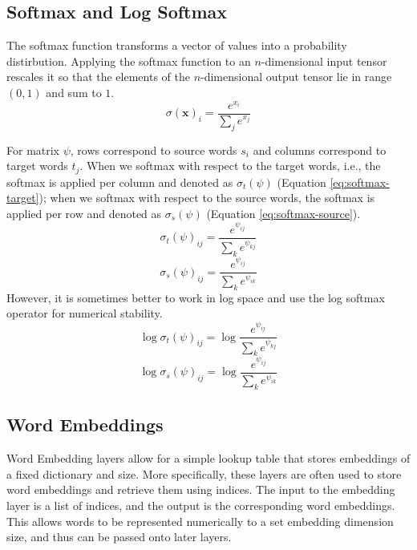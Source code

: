 \documentclass[twoside,twocolumn]{article}
\renewcommand{\vec}[1]{\mathbf{#1}}
\begin{document}
\subsection{Softmax and Log Softmax}
The softmax function transforms a vector of values into a probability
distirbution. Applying the softmax function to an $n$-dimensional input tensor
rescales it so that the elements of the $n$-dimensional output tensor lie in
range $(0,1)$ and sum to $1$.
\begin{equation}
  \sigma(\vec{x})_i = \frac{e^{x_i}}{\sum_j e^{x_j}}
\end{equation}

For matrix $\psi$, rows correspond to source words $s_i$ and columns correspond
to target words $t_j$. When we softmax with respect to the target words, i.e.,
the softmax is applied per column and denoted as $\sigma_t(\psi)$
(Equation \ref{eq:softmax-target}); when we softmax with respect to the source words, the softmax is applied per row and denoted as $\sigma_s(\psi)$
(Equation \ref{eq:softmax-source}).
\begin{equation}
  \label{eq:softmax-target}
  \sigma_t(\psi)_{ij} = \frac{e^{\psi_{ij}}}{\sum_{k} e^{\psi_{kj}}}
\end{equation}
\begin{equation}
  \label{eq:softmax-source}
  \sigma_s(\psi)_{ij} = \frac{e^{\psi_{ij}}}{\sum_{k} e^{\psi_{ik}}}
\end{equation}
However, it is sometimes better to work in log space and use the log
softmax operator for numerical stability.
\begin{equation}
  \log \sigma_t(\psi)_{ij} = \log \frac{e^{\psi_{ij}}}{\sum_{k} e^{\psi_{kj}}}
\end{equation}
\begin{equation}
  \log \sigma_s(\psi)_{ij} = \log \frac{e^{\psi_{ij}}}{\sum_{k} e^{\psi_{ik}}}
\end{equation}

\subsection{Word Embeddings}
Word Embedding layers allow for a simple lookup table that stores embeddings
of a fixed dictionary and size. More specifically, these layers are often used
to store word embeddings and retrieve them using indices. The input to the
embedding layer is a list of indices, and the output is the corresponding
word embeddings. This allows words to be represented numerically to a set
embedding dimension size, and thus can be passed onto later layers.
\end{document}
